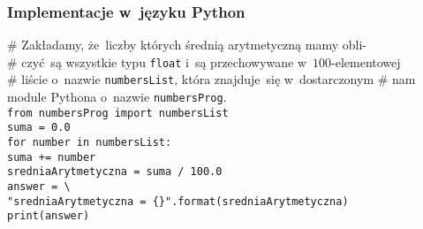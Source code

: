 \documentclass[10pt,t]{beamer}
\begin{document}
\begin{frame}
  \frametitle{Implementacje w~języku Python}


  \# Zakładamy, że~liczby których średnią arytmetyczną mamy obli- \\
  \# czyć~są wszystkie typu \texttt{float} i~są przechowywane
  w~$100$-elementowej \\
  \# liście o~nazwie \texttt{numbersList}, która znajduje~się w~dostarczonym
  \# nam module Pythona o~nazwie \texttt{numbersProg}. \\
  \vspace{0.8em}
  \texttt{from numbersProg import numbersList} \\
  \vspace{0.8em}
  \texttt{suma = 0.0} \\
  \vspace{0.8em}
  \texttt{for number in numbersList:} \\
  \hphantom{aaaa} \texttt{suma += number} \\
  \vspace{0.8em}
  \texttt{sredniaArytmetyczna = suma / 100.0} \\
  \texttt{answer = \textbackslash} \\
  \hphantom{aaa}
  \texttt{"sredniaArytmetyczna = \{\}".format(sredniaArytmetyczna)}
  \\
  \vspace{0.8em}
  \texttt{print(answer)}

\end{frame}




























\end{document}
